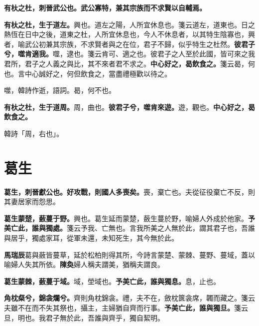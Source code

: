 \textbf{有杕之杜，刺晉武公也。武公寡特，兼其宗族而不求賢以自輔焉。}

\textbf{有杕之杜，生于道左。}{\footnotesize 興也。道左之陽，人所宜休息也。箋云道左，道東也。日之熱恆在日中之後，道東之杜，人所宜休息也，今人不休息者，以其特生陰寡也，興者，喻武公初兼其宗族，不求賢者與之在位，君子不歸，似乎特生之杜然。}\textbf{彼君子兮，噬肯適我。}{\footnotesize 噬，逮也。箋云肯可、適之也。彼君子之人至於此國，皆可來之我君所，君子之人義之與比，其不來者君不求之。}\textbf{中心好之，曷飲食之。}{\footnotesize 箋云曷，何也。言中心誠好之，何但飲食之，當盡禮極歡以待之。}

\begin{quoting}噬，韓詩作逝，語詞。曷，何不也。\end{quoting}

\textbf{有杕之杜，生于道周。}{\footnotesize 周，曲也。}\textbf{彼君子兮，噬肯來遊。}{\footnotesize 遊，觀也。}\textbf{中心好之，曷飲食之。}

\begin{quoting}韓詩「周，右也」。\end{quoting}

\section{葛生}


\textbf{葛生，刺晉獻公也。好攻戰，則國人多喪矣。}{\footnotesize 喪，棄亡也。夫從征役棄亡不反，則其妻居家而怨思。}

\textbf{葛生蒙楚，蘞蔓于野。}{\footnotesize 興也。葛生延而蒙楚，蘞生蔓於野，喻婦人外成於他家。}\textbf{予美亡此，誰與獨處。}{\footnotesize 箋云予我、亡無也。言我所美之人無於此，謂其君子也，吾誰與居乎，獨處家耳，從軍未還，未知死生，其今無於此。}

\begin{quoting}\textbf{馬瑞辰}葛與蘞皆蔓草，延於松柏則得其所，今詩言蒙楚、蒙棘、蔓野、蔓域，蓋以喻婦人失其所依。\textbf{陳奐}婦人稱夫謂美，猶稱夫謂良。\end{quoting}

\textbf{葛生蒙棘，蘞蔓于域。}{\footnotesize 域，塋域也。}\textbf{予美亡此，誰與獨息。}{\footnotesize 息，止也。}

\textbf{角枕粲兮，錦衾爛兮。}{\footnotesize 齊則角枕錦衾。禮，夫不在，斂枕篋衾席，韣而藏之。箋云夫雖不在而不失其祭也，攝主，主婦猶自齊而行事。}\textbf{予美亡此，誰與獨旦。}{\footnotesize 箋云旦，明也。我君子無於此，吾誰與齊乎，獨自絜明。}

